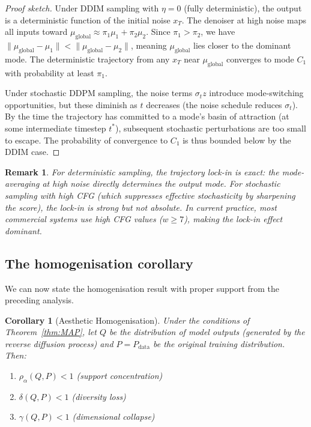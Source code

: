 \documentclass[11pt]{article}
\newtheorem{corollary}[theorem]{Corollary}
\newtheorem{remark}[theorem]{Remark}
\begin{document}
\begin{proof}[Proof sketch]
Under DDIM sampling \citep{Song2020DDIM} with $\eta = 0$ (fully deterministic), the output is a deterministic function of the initial noise $x_T$. The denoiser at high noise maps all inputs toward $\mu_{\mathrm{global}} \approx \pi_1 \mu_1 + \pi_2 \mu_2$. Since $\pi_1 > \pi_2$, we have $\|\mu_{\mathrm{global}} - \mu_1\| < \|\mu_{\mathrm{global}} - \mu_2\|$, meaning $\mu_{\mathrm{global}}$ lies closer to the dominant mode. The deterministic trajectory from any $x_T$ near $\mu_{\mathrm{global}}$ converges to mode $C_1$ with probability at least $\pi_1$.

Under stochastic DDPM sampling, the noise terms $\sigma_t z$ introduce mode-switching opportunities, but these diminish as $t$ decreases (the noise schedule reduces $\sigma_t$). By the time the trajectory has committed to a mode's basin of attraction (at some intermediate timestep $t^*$), subsequent stochastic perturbations are too small to escape. The probability of convergence to $C_1$ is thus bounded below by the DDIM case.
\end{proof}

\begin{remark}
For deterministic sampling, the trajectory lock-in is exact: the mode-averaging at high noise directly determines the output mode. For stochastic sampling with high CFG (which suppresses effective stochasticity by sharpening the score), the lock-in is strong but not absolute. In current practice, most commercial systems use high CFG values ($w \geq 7$), making the lock-in effect dominant.
\end{remark}

\subsection{The homogenisation corollary}

We can now state the homogenisation result with proper support from the preceding analysis.

\begin{corollary}[Aesthetic Homogenisation]\label{cor:homogen}
Under the conditions of Theorem~\ref{thm:MAP}, let $Q$ be the distribution of model outputs (generated by the reverse diffusion process) and $P = P_{\mathrm{data}}$ be the original training distribution. Then:
\begin{enumerate}
 \item $\rho_\alpha(Q,P) < 1$ \quad (support concentration)
 \item $\delta(Q,P) < 1$ \quad (diversity loss)
 \item $\gamma(Q,P) < 1$ \quad (dimensional collapse)
\end{enumerate}
\end{corollary}
\end{document}
